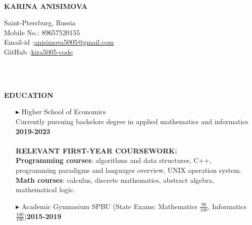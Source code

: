 \documentclass[a4paper,10pt]{article}
\begin{document}
	\hspace{0.5cm}\\[-0.2cm]
	\begin{minipage}{0.5\textwidth}
		\begin{flushleft}
			\huge \textbf{\* \* KARINA ANISIMOVA} 
			\normalsize
		\end{flushleft}
	\end{minipage}
	\begin{minipage}{0.51\textwidth}
		\begin{flushright}
			\textcolor[gray]{0.3}{
				\indent Saint-Ptersburg, Russia\\
				\indent Mobile No.: 89657520155  \\
				\indent Email-id :\href{mailto:anisimova5005@gmail.com} {anisimova5005@gmail.com}\\ 
				\indent GitHub :\href{https://github.com/Kira5005-code} {kira5005-code}\\  	
			}
		\end{flushright}
	\end{minipage}
	\\ \\
	
	
	
	\colorbox{magicmint}{
		\begin{minipage}{0.96\textwidth}
			\vphantom{.}
			\textbf{EDUCATION}
		\end{minipage}
	}
	
	\begin{itemize}
		\item [$\blacktriangleright$]  Higher School of Economics\\ Currently pursuing bachelors degree in applied mathematics and informatics \hspace{2.8cm} \textbf{2019-2023} \\ \\
		\textbf{RELEVANT FIRST-YEAR COURSEWORK:}\\
		\textbf{Programming courses}{: algorithms and data structures, C++, programming paradigms and languages overview, UNIX operation system.}\\
		\textbf{Math courses}{: calculus, discrete mathematics, abstract algebra, mathematical logic.}\\
		\item[$\blacktriangleright$]  Academic Gymnasium SPBU (State Exams: Mathematics $\frac{98}{100}$, Informatics $\frac{100}{100}$)\hspace{2.9cm}\textbf{2015-2019}
	\end{itemize}
	
\end{document}
